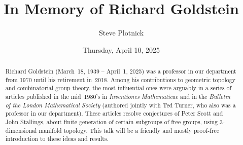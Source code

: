 \documentclass{UAmathtalk}
\author{Steve Plotnick}
\title{In Memory of Richard Goldstein}
\date{Thursday, April 10, 2025}
\begin{document}
\maketitle

\begin{abstract}
Richard Goldstein (March~18, 1939 -- April~1, 2025) was a professor in our department from 1970 until his retirement in~2018.
Among his contributions to geometric topology and combinatorial group theory, the most influential ones were arguably in a series of articles published in the mid~1980’s in \emph{Inventiones Mathematicae} and in the \emph{Bulletin of the London Mathematical Society} (authored jointly with Ted Turner, who also was a professor in our department).
These articles resolve conjectures of Peter Scott and John Stallings, about finite generation of certain subgroups of free groups, using 3-dimensional manifold topology.
This talk will be a friendly and mostly proof-free introduction to these ideas and results.
\end{abstract}
\end{document}
